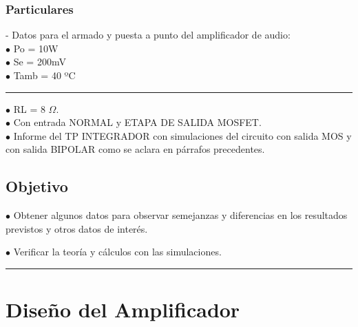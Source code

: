 \documentclass[12pt,a4paper]{report}
\begin{document}
\begin{flushleft}
\subsection{Particulares}
\hspace{0.2cm}   - Datos para el armado y puesta a punto del amplificador de audio: \\
\hspace{1cm}   $ \bullet $ Po = 10W \\
\hspace{1cm}   $ \bullet $ Se = 200mV \\
\hspace{1cm}   $ \bullet $ Tamb = 40 ºC \\
\vfill
\textcolor{red}{\rule{15cm}{0.2mm}}\par \vspace{0.5cm}
\newpage
\hspace{1cm}   $ \bullet $ RL =  8 $ \Omega $. \\
\hspace{1cm}   $ \bullet $ Con entrada NORMAL  y  ETAPA DE SALIDA MOSFET. \\
\hspace{0.2cm}   $ \bullet $ Informe del TP INTEGRADOR con simulaciones del circuito con salida MOS  y con salida BIPOLAR como se aclara en párrafos precedentes.   
\section{Objetivo}
$ \bullet $ Obtener algunos datos para observar semejanzas y  diferencias en los resultados previstos y otros datos de interés. 

$ \bullet $ Verificar la teoría y cálculos con las simulaciones.

\vfill
\textcolor{red}{\rule{15cm}{0.2mm}}\par \vspace{0.5cm}
\newpage
\chapter{Diseño del Amplificador}


\end{flushleft}
\end{document}
